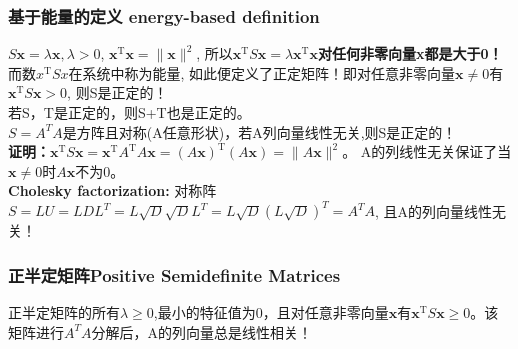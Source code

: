     \subsubsection{基于能量的定义 energy-based definition}
    $S \boldsymbol{x}=\lambda \boldsymbol{x}, \lambda >0$, $\boldsymbol{x}^{\mathrm{T}} \boldsymbol{x}=\|\boldsymbol{x}\|^{2}$, 所以$\boldsymbol{x}^{\mathrm{T}} S \boldsymbol{x}=\lambda \boldsymbol{x}^{\mathrm{T}} \boldsymbol{x}$\textbf{对任何非零向量x都是大于0！}
    \\
    而数$x^{\mathrm{T}} S x$在系统中称为能量, 如此便定义了正定矩阵！即对任意非零向量$\bm{x}\neq 0$有$\bm{x}^{\mathrm{T}} S \bm{x}>0$, 则S是正定的！
    \\
    若S，T是正定的，则S+T也是正定的。\\
    $S=A^{T}A$是方阵且对称(A任意形状)，若A列向量线性无关,则S是正定的！\\
    \textbf{证明：}$\bm{x}^{\mathrm{T}} S \bm{x}= \boldsymbol{x}^{\mathrm{T}} A^{\mathrm{T}} A \bm{x} =(A \boldsymbol{x})^{\mathrm{T}}(A \boldsymbol{x})=\|A \boldsymbol{x}\|^{2}$。
    A的列线性无关保证了当$\bm{x} \neq 0$时$A \boldsymbol{x}$不为0。\\
    \textbf{Cholesky factorization:} 对称阵$S=LU=LDL^{T}=L\sqrt{D} \sqrt{D}L^{T}=L\sqrt{D} (L \sqrt{D})^{T}=A^{T}A $, 且A的列向量线性无关！

    \subsubsection{正半定矩阵Positive Semidefinite Matrices}
    正半定矩阵的所有$\lambda \geq 0$,最小的特征值为0，且对任意非零向量$\bm{x}$有$\boldsymbol{x}^{\mathrm{T}} S \boldsymbol{x} \geq 0$。该矩阵进行$A^{T}A$分解后，A的列向量总是线性相关！

